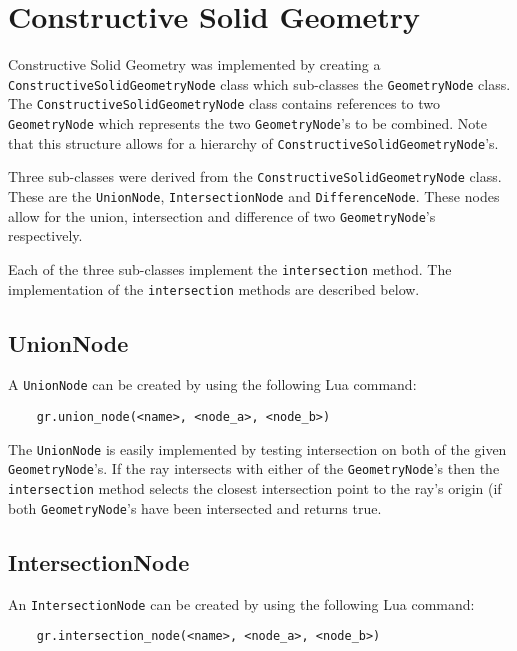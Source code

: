 \section{Constructive Solid Geometry}

Constructive Solid Geometry was implemented by creating a
\newline \verb|ConstructiveSolidGeometryNode| class which sub-classes the 
\newline \verb|GeometryNode| class. The \verb|ConstructiveSolidGeometryNode| class 
contains references to two \verb|GeometryNode| which represents the two
\newline \verb|GeometryNode|'s to be combined. Note that this structure allows for a
hierarchy of \verb|ConstructiveSolidGeometryNode|'s.

Three sub-classes were derived from the \newline \verb|ConstructiveSolidGeometryNode|
class. These are the \verb|UnionNode|, \verb|IntersectionNode| and
\verb|DifferenceNode|. These nodes allow for the union, intersection and
difference of two \verb|GeometryNode|'s respectively.

Each of the three sub-classes implement the \verb|intersection| method. The
implementation of the \verb|intersection| methods are described below.

\subsection*{UnionNode}
A \verb|UnionNode| can be created by using the following Lua command: 
\begin{lstlisting}
    gr.union_node(<name>, <node_a>, <node_b>)
\end{lstlisting}

The \verb|UnionNode| is easily implemented by testing intersection on both of
the given \verb|GeometryNode|'s. If the ray intersects with either of the 
\verb|GeometryNode|'s then the \verb|intersection| method selects the closest
intersection point to the ray's origin (if both \verb|GeometryNode|'s have been 
intersected  and returns true. 

\subsection*{IntersectionNode}
An \verb|IntersectionNode| can be created by using the following Lua command:
\begin{lstlisting}
    gr.intersection_node(<name>, <node_a>, <node_b>)
\end{lstlisting}

